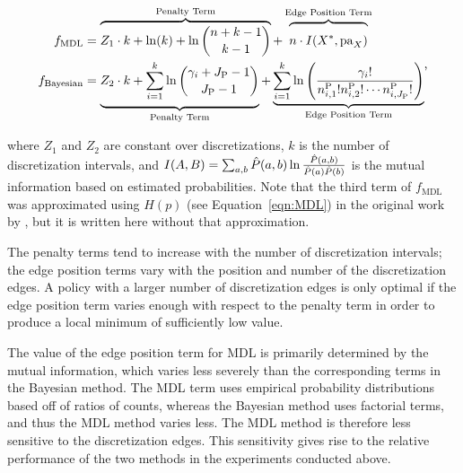 \begin{small}
  \begin{equation}
  \begin{aligned}
  f_{\text{MDL}} & = \overbrace{Z_1 \cdot k + \ln(k) + \ln {{n +k - 1}\choose{k -1}} }^{\text{Penalty Term}}+   \overbrace{\rule{0pt}{1.35em} n \cdot I(X^*, \Pa_X)}^{\text{Edge Position Term}} \\
  f_{\text{Bayesian}} &= \underbrace{{\vrule width0pt height0pt depth1.48em\relax}  Z_2 \cdot k + \sum_{i=1}^k \ln {{\gamma_i + J_\text{P} - 1}\choose{J_\text{P} -1}}}_{\text{Penalty Term}} + \underbrace{\sum^k_{i=1} \ln \left(   {{\gamma_i !}\over{n^{\text{P}}_{i,1}! n^{\text{P}}_{i,2}! \cdots n^{\text{P}}_{i,J_\text{P}}!    }} \right) }_{\text{Edge Position Term}}
  \end{aligned}\text{,}
  \end{equation}
\end{small}

\noindent
where $Z_1$ and $Z_2$ are constant over discretizations, $k$ is the number of discretization intervals, and $I\paren{A, B} = \sum_{a,b} \hat{P}(a,b) \ln\frac{\hat{P}(a,b)}{\hat{P}(a)\hat{P}(b)}$ is the mutual information based on estimated probabilities.
Note that the third term of $f_\text{MDL}$ was approximated using $H(p)$ (see Equation~\ref{eqn:MDL}) in the original work by \cite{Friedman_1996}, but it is written here without that approximation.

The penalty terms tend to increase with the number of discretization intervals; the edge position terms vary with the position and number of the discretization edges.
A policy with a larger number of discretization edges is only optimal if the edge position term varies enough with respect to the penalty term in order to produce a local minimum of sufficiently low value.

The value of the edge position term for MDL is primarily determined by the mutual information, which varies less severely than the corresponding terms in the Bayesian method.
The MDL term uses empirical probability distributions based off of ratios of counts, whereas the Bayesian method uses factorial terms, and thus the MDL method varies less.
The MDL method is therefore less sensitive to the discretization edges.
This sensitivity gives rise to the relative performance of the two methods in the experiments conducted above.

